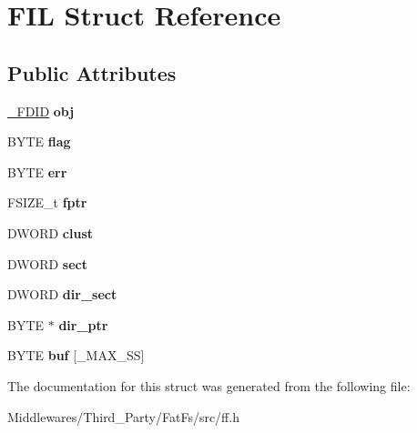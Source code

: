 \hypertarget{struct_f_i_l}{}\section{F\+IL Struct Reference}
\label{struct_f_i_l}
\subsection*{Public Attributes}
\begin{DoxyCompactItemize}
\item 
\mbox{\label{struct_f_i_l_ae7242545ea88ea2602484122ebe65fa3}} 
\mbox{\hyperlink{struct___f_d_i_d}{\+\_\+\+F\+D\+ID}} {\bfseries obj}
\item 
\mbox{\label{struct_f_i_l_ac409508881f5a16f2998ae675072b376}} 
B\+Y\+TE {\bfseries flag}
\item 
\mbox{\label{struct_f_i_l_aea440945db26de9c4a88065c0c887fda}} 
B\+Y\+TE {\bfseries err}
\item 
\mbox{\label{struct_f_i_l_a088b03ab2e02f82e10e17bdd938190a6}} 
F\+S\+I\+Z\+E\+\_\+t {\bfseries fptr}
\item 
\mbox{\label{struct_f_i_l_aa41312aba551b9a6d1c9d3c8c7d2734b}} 
D\+W\+O\+RD {\bfseries clust}
\item 
\mbox{\label{struct_f_i_l_affec18b48fe716fdae6a60123fc61145}} 
D\+W\+O\+RD {\bfseries sect}
\item 
\mbox{\label{struct_f_i_l_ab203794f939ad4480e81dfa488770783}} 
D\+W\+O\+RD {\bfseries dir\+\_\+sect}
\item 
\mbox{\label{struct_f_i_l_a5af9e9fb312b629220eaf684dd28c4a9}} 
B\+Y\+TE $\ast$ {\bfseries dir\+\_\+ptr}
\item 
\mbox{\label{struct_f_i_l_a7a95fb86588663e48309b5cded7e207b}} 
B\+Y\+TE {\bfseries buf} \mbox{[}\+\_\+\+M\+A\+X\+\_\+\+SS\mbox{]}
\end{DoxyCompactItemize}


The documentation for this struct was generated from the following file\+:\begin{DoxyCompactItemize}
\item 
Middlewares/\+Third\+\_\+\+Party/\+Fat\+Fs/src/ff.\+h\end{DoxyCompactItemize}
